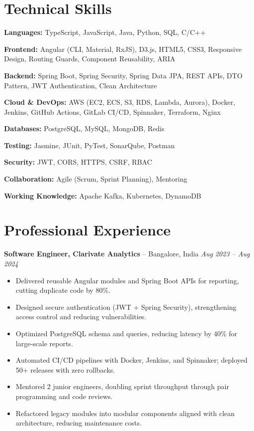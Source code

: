 \documentclass[10pt, letterpaper]{article}
\newenvironment{highlights}{\begin{itemize}[topsep=0.05cm,parsep=0.05cm,partopsep=0pt,itemsep=2pt,leftmargin=10pt]}{\end{itemize}}
\newenvironment{onecolentry}{\begin{adjustwidth}{0cm}{0cm}}{\end{adjustwidth}}
\begin{document}
\section{Technical Skills}
\begin{onecolentry}
    \item \textbf{Languages:} TypeScript, JavaScript, Java, Python, SQL, C/C++
    \item \textbf{Frontend:} Angular (CLI, Material, RxJS), D3.js, HTML5, CSS3, Responsive Design, Routing Guards, Component Reusability, ARIA
    \item \textbf{Backend:} Spring Boot, Spring Security, Spring Data JPA, REST APIs, DTO Pattern, JWT Authentication, Clean Architecture
    \item \textbf{Cloud \& DevOps:} AWS (EC2, ECS, S3, RDS, Lambda, Aurora), Docker, Jenkins, GitHub Actions, GitLab CI/CD, Spinnaker, Terraform, Nginx
    \item \textbf{Databases:} PostgreSQL, MySQL, MongoDB, Redis
    \item \textbf{Testing:} Jasmine, JUnit, PyTest, SonarQube, Postman
    \item \textbf{Security:} JWT, CORS, HTTPS, CSRF, RBAC
    \item \textbf{Collaboration:} Agile (Scrum, Sprint Planning), Mentoring
    \item \textbf{Working Knowledge:} Apache Kafka, Kubernetes, DynamoDB
\end{onecolentry}

\section{Professional Experience}

\textbf{Software Engineer, Clarivate Analytics} -- Bangalore, India \hfill \textit{Aug 2023 -- Aug 2024} \\
\begin{highlights}
    \item Delivered reusable Angular modules and Spring Boot APIs for reporting, cutting duplicate code by 80\%.
    \item Designed secure authentication (JWT + Spring Security), strengthening access control and reducing vulnerabilities.
    \item Optimized PostgreSQL schema and queries, reducing latency by 40\% for large-scale reports.
    \item Automated CI/CD pipelines with Docker, Jenkins, and Spinnaker; deployed 50+ releases with zero rollbacks.
    \item Mentored 2 junior engineers, doubling sprint throughput through pair programming and code reviews.
    \item Refactored legacy modules into modular components aligned with clean architecture, reducing maintenance costs.
\end{highlights}
\end{document}
